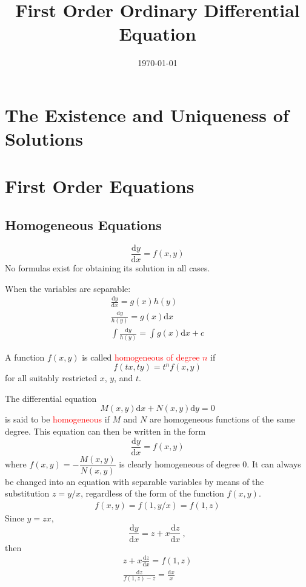 \documentclass[11pt,a4paper]{article}
\title{First Order Ordinary Differential Equation}
\author{}
\date{\today}
\newcommand{\dif}{\mathrm{d}}
\begin{document}
\maketitle

\section{The Existence and Uniqueness of Solutions}
\cite{george1991differential, simmons2016differential} 

\section{First Order Equations}
\subsection{Homogeneous Equations}
\cite{george1991differential, simmons2016differential} 
\begin{equation*}
\frac{\dif y}{\dif x} = f(x, y)
\end{equation*}
No formulas exist for obtaining its solution in all cases. 

When the variables are separable:
\begin{eqnarray*}
\frac{\dif y}{\dif x} = g(x)h(y) \\
\frac{\dif y}{h(y)} = g(x) \dif x \\
\int \frac{\dif y}{h(y)} = \int g(x) \dif x +c
\end{eqnarray*}

A function $f(x,y)$ is called \textcolor{red}{homogeneous of degree $n$} if
\begin{equation*}
f(tx, ty) = t^n f(x, y)
\end{equation*}
for all suitably restricted $x$, $y$, and $t$.

The differential equation
\begin{equation*}
M(x, y) \dif x +N(x, y)\dif y =0
\end{equation*}
is said to be \textcolor{red}{homogeneous} if $M$ and $N$ are homogeneous functions of the same degree. This equation can then be written in the form
\begin{equation*}
\frac{\dif y}{\dif x} = f(x, y)
\end{equation*}
where $f(x, y) = -\dfrac{M(x, y)}{N(x, y)}$ is clearly homogeneous of degree $0$. It can always be changed into an equation with separable variables by means of the substitution $z = y/x$, regardless of the form of the function $f(x,y)$.
\begin{eqnarray*}
f(x,y) = f(1, y/x) = f(1, z)
\end{eqnarray*}
Since $y=zx$, 
\begin{equation*}
\frac{\dif y}{\dif x} = z +x\frac{\dif z}{\dif x} ~,
\end{equation*}
then
\begin{eqnarray*}
z +x\frac{\dif z}{\dif x} = f(1, z) \\
\frac{\dif z}{f(1, z) -z} = \frac{\dif x}{x}
\end{eqnarray*}
\end{document}
